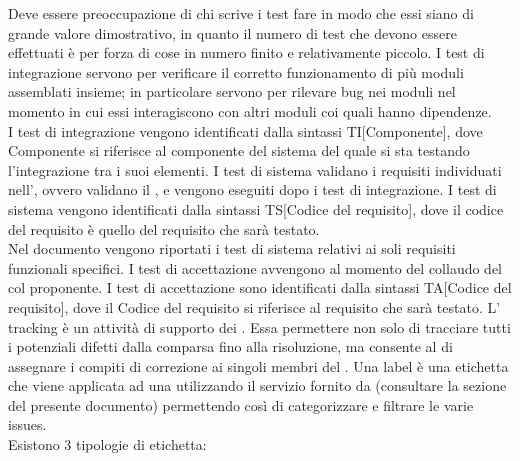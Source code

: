 				Deve essere preoccupazione di chi scrive i test fare in modo che essi siano di grande valore dimostrativo, in quanto il numero di test che devono essere effettuati è per forza di cose in numero finito e relativamente piccolo.
					I test di integrazione servono per verificare il corretto funzionamento di più moduli assemblati insieme; in particolare servono per rilevare bug nei moduli nel momento in cui essi interagiscono con altri moduli coi quali hanno dipendenze.\\
					I test di integrazione vengono identificati dalla sintassi TI[Componente], dove Componente si riferisce al componente del sistema del quale si sta testando l'integrazione tra i suoi elementi.
					I test di sistema validano i requisiti individuati nell', ovvero validano il  , e vengono eseguiti dopo i test di integrazione.
					I test di sistema vengono identificati dalla sintassi TS[Codice del requisito], dove il codice del requisito è quello del requisito che sarà testato.\\
					Nel documento  vengono riportati i test di sistema relativi ai soli requisiti funzionali specifici.
					I test di accettazione avvengono al momento del collaudo del  col proponente.
					I test di accettazione sono identificati dalla sintassi TA[Codice del requisito], dove il Codice del requisito si riferisce al requisito che sarà testato.
			L' tracking è un attività di supporto dei . Essa permettere non solo di tracciare tutti i potenziali difetti dalla comparsa fino alla risoluzione, ma consente al  di assegnare i compiti di correzione ai singoli membri del .
				\label{sec:SintassiLabel}
				Una label è una etichetta che viene applicata ad una  utilizzando il servizio fornito da  (consultare la sezione  del presente documento) permettendo così di categorizzare e filtrare le varie issues.\\
				Esistono 3 tipologie di etichetta:
